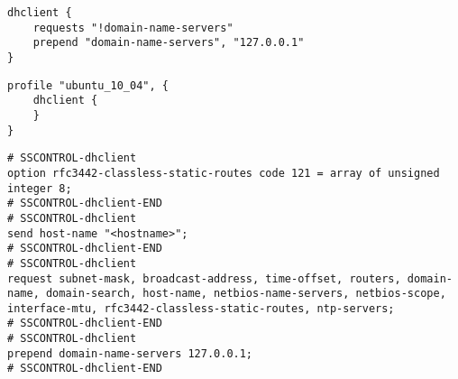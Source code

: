 
\begin{lstlisting}[style=Java,label=lst:dhclient_example_script,
title={Example script for the Dhclient service. It will remove the domain name servers from the DHCP request and use the DNS server on the localhost.}]
dhclient {
    requests "!domain-name-servers"
    prepend "domain-name-servers", "127.0.0.1"
}
\end{lstlisting}

\begin{lstlisting}[style=Java,label=lst:dhclient_ubuntu_profile_min,
title={Minimal Ubuntu Dhclient profile, all needed profile properties are already set to sensible default values.}]
profile "ubuntu_10_04", {
    dhclient {
    }
}
\end{lstlisting}

\begin{lstlisting}[style=rcfile_nonumbers,
label=lst:dhclient_maincf_example,
title={Example of the DHCP configuration file that is created from the Dhclient profile.
The file is saved as /etc/dhcp3/dhclient.conf}]
# SSCONTROL-dhclient
option rfc3442-classless-static-routes code 121 = array of unsigned integer 8;
# SSCONTROL-dhclient-END
# SSCONTROL-dhclient
send host-name "<hostname>";
# SSCONTROL-dhclient-END
# SSCONTROL-dhclient
request subnet-mask, broadcast-address, time-offset, routers, domain-name, domain-search, host-name, netbios-name-servers, netbios-scope, interface-mtu, rfc3442-classless-static-routes, ntp-servers;
# SSCONTROL-dhclient-END
# SSCONTROL-dhclient
prepend domain-name-servers 127.0.0.1;
# SSCONTROL-dhclient-END
\end{lstlisting}

